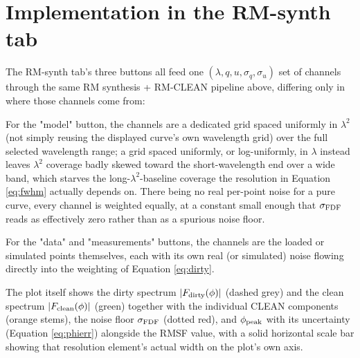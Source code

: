 \section{Implementation in the RM-synth tab}
The RM-synth tab's three buttons all feed one $(\lambda,q,u,\sigma_q,\sigma_u)$ set of channels through the same RM synthesis + RM-CLEAN pipeline above, differing only in where those channels come from:

For the "model" button, the channels are a dedicated grid spaced uniformly in $\lambda^2$ (not simply reusing the displayed curve's own wavelength grid) over the full selected wavelength range; a grid spaced uniformly, or log-uniformly, in $\lambda$ instead leaves $\lambda^2$ coverage badly skewed toward the short-wavelength end over a wide band, which starves the long-$\lambda^2$-baseline coverage the resolution in Equation \ref{eq:fwhm} actually depends on. There being no real per-point noise for a pure curve, every channel is weighted equally, at a constant small enough that $\sigma_{\rm FDF}$ reads as effectively zero rather than as a spurious noise floor.

For the "data" and "measurements" buttons, the channels are the loaded or simulated points themselves, each with its own real (or simulated) noise flowing directly into the weighting of Equation \ref{eq:dirty}.

The plot itself shows the dirty spectrum $|F_{\rm dirty}(\phi)|$ (dashed grey) and the clean spectrum $|F_{\rm clean}(\phi)|$ (green) together with the individual CLEAN components (orange stems), the noise floor $\sigma_{\rm FDF}$ (dotted red), and $\phi_{\rm peak}$ with its uncertainty (Equation \ref{eq:phierr}) alongside the RMSF value, with a solid horizontal scale bar showing that resolution element's actual width on the plot's own axis.
